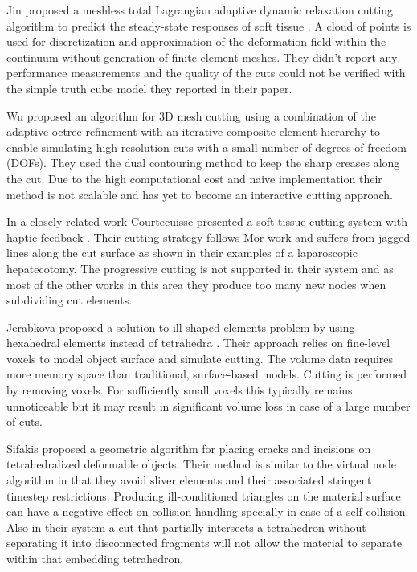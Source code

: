 Jin \etal proposed a meshless total Lagrangian adaptive dynamic relaxation cutting algorithm to predict the steady-state 
responses of soft tissue \cite{Jin2013}. A cloud of points is used for discretization and approximation of the deformation 
field within the continuum without generation of finite element meshes. They didn't report 
any performance measurements and the quality of the cuts could not be verified with the simple truth cube model they reported in their paper.
 
Wu \etal \cite{Wu2011} proposed an algorithm for 3D mesh cutting using a combination of the adaptive octree refinement with an iterative composite
element hierarchy to enable simulating high-resolution cuts with a small number of degrees of freedom (DOFs). 
They used the dual contouring method \cite{Ju2002} to keep the sharp creases along the cut. Due to the high computational cost and naive implementation 
their method is not scalable and has yet to become an interactive cutting approach.

In a closely related work Courtecuisse \etal presented a soft-tissue cutting system with haptic 
feedback \cite{Courtecuisse2010a}. Their cutting strategy follows Mor \etal  \cite{Mor2000} work and 
suffers from jagged lines along the cut surface as shown in their examples of a laparoscopic hepatecotomy.
The progressive cutting is not supported in their system and as most of the other works in this area they produce too many
new nodes when subdividing cut elements.

Jerabkova \etal proposed a solution to ill-shaped elements problem by using hexahedral elements instead of 
tetrahedra \cite{Jerabkova2010}. Their approach relies on fine-level voxels to model object surface and simulate cutting. 
The volume data requires more memory space than traditional, surface-based models. Cutting is performed by
removing voxels. For sufficiently small voxels this typically remains unnoticeable but it may result in 
significant volume loss in case of a large number of cuts. 


Sifakis \etal \cite{Sifakis2007} proposed a geometric algorithm for placing cracks and incisions on 
tetrahedralized deformable objects. Their method is similar to the virtual node algorithm in that they avoid 
sliver elements and their associated stringent timestep restrictions. Producing ill-conditioned triangles on 
the material surface can have a negative effect on collision handling specially in case of a self collision.
Also in their system a cut that partially intersects a tetrahedron without separating it into disconnected 
fragments will not allow the material to separate within that embedding tetrahedron.

